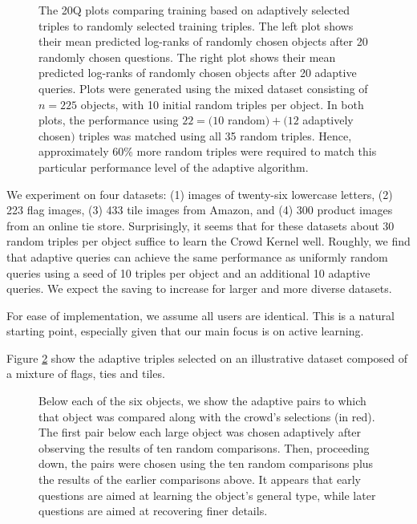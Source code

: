 \documentclass{article}
\begin{document}
\begin{figure}
 \caption{\label{fig:YAY} The 20Q plots comparing training based on adaptively selected triples to randomly selected training triples.  The left plot shows their mean predicted log-ranks of randomly chosen objects after 20 randomly chosen questions. The right plot shows their mean predicted log-ranks of randomly chosen objects after 20 adaptive queries.
Plots were generated using the mixed dataset consisting of $n=225$ objects, with 10 initial random triples per object.  In both plots, the performance using $22 = (10 $ random$) + (12$ adaptively chosen$)$ triples was matched using all 35 random triples.  Hence, approximately 60\% more random triples were required to match this particular performance level of the adaptive algorithm.
}
\end{figure}


We experiment on four datasets: (1) images of twenty-six lowercase
letters, (2) 223 flag images, (3) 433 tile images from Amazon, and (4)
300 product images from an online tie store. Surprisingly, it seems
that for these datasets about 30 random triples per object suffice to
learn the Crowd Kernel well. Roughly, we find that adaptive queries
can achieve the same performance as uniformly random queries using a
seed of 10 triples per object and an additional 10 adaptive
queries. We expect the saving to increase for larger and more diverse
datasets.

For ease of implementation, we assume all users are identical.  This
is a natural starting point, especially given that our main focus is
on active learning.

Figure \ref{fig:adaptive-trips} show the adaptive triples selected on
an illustrative dataset composed of a mixture of flags, ties and
tiles.

\begin{figure}
 \caption{\label{fig:adaptive-trips} Below each of the six objects, we show the adaptive pairs to which that object was compared along with the crowd's selections (in red).  The first pair below each large object was chosen adaptively after observing the results of ten random comparisons.  Then, proceeding down, the pairs were chosen using the ten random comparisons plus the results of the earlier comparisons above.  It appears that early questions are aimed at learning the object's general type, while later questions are aimed at recovering finer details.}
\end{figure}
\end{document}
